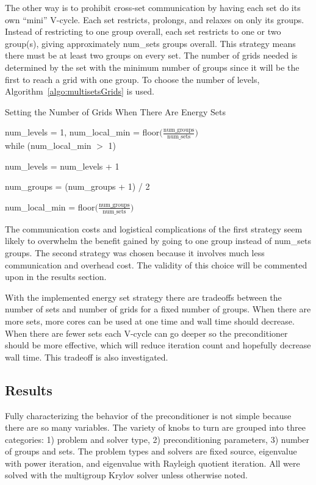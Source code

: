 The other way is to prohibit cross-set communication by having each set do its own ``mini'' V-cycle. Each set restricts, prolongs, and relaxes on only its groups. Instead of restricting to one group overall, each set restricts to one or two group(s), giving approximately num\_sets groups overall. This strategy means there must be at least two groups on every set. The number of grids needed is determined by the set with the minimum number of groups since it will be the first to reach a grid with one group. To choose the number of levels, Algorithm~\ref{algo:multisetsGrids} is used. 
%
\begin{algorithm}
  \caption{ Setting the Number of Grids When There Are Energy Sets}
  \label{algo:multisetsGrids}
   num\_levels = 1, num\_local\_min = floor$\bigl( \frac{\text{num\_groups}}{\text{num\_sets}}\bigr)$ \\
   while (num\_local\_min $>$ 1)
  \begin{list}{}{\hspace{2.5em}}
    \item num\_levels = num\_levels + 1
    \item num\_groups = (num\_groups + 1) / 2
    \item num\_local\_min = floor$\bigl( \frac{\text{num\_groups}}{\text{num\_sets}}\bigr)$
   \end{list}
\end{algorithm}

The communication costs and logistical complications of the first strategy seem likely to overwhelm the benefit gained by going to one group instead of num\_sets groups. The second strategy was chosen because it involves much less communication and overhead cost. The validity of this choice will be commented upon in the results section. 

With the implemented energy set strategy there are tradeoffs between the number of sets and number of grids for a fixed number of groups. When there are more sets, more cores can be used at one time and wall time should decrease. When there are fewer sets each V-cycle can go deeper so the preconditioner should be more effective, which will reduce iteration count and hopefully decrease wall time. This tradeoff is also investigated.

\subsection{Results}
Fully characterizing the behavior of the preconditioner is not simple because there are so many variables. The variety of knobs to turn are grouped into three categories: 1) problem and solver type, 2) preconditioning parameters, 3) number of groups and sets. The problem types and solvers are fixed source, eigenvalue with power iteration, and eigenvalue with Rayleigh quotient iteration. All were solved with the multigroup Krylov solver unless otherwise noted. 

